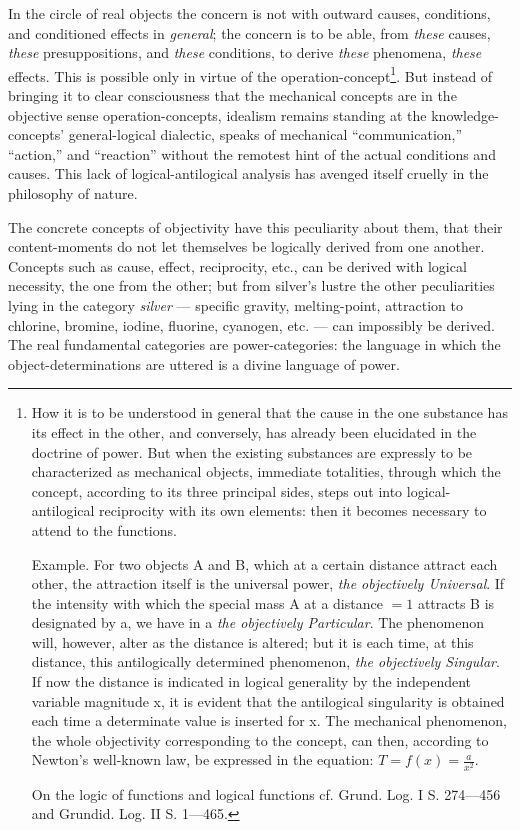 \documentclass[12pt]{book}
\begin{document}
In the circle of real objects the concern is not with outward
causes, conditions, and conditioned effects in \emph{general}; the
concern is to be able, from \emph{these} causes, \emph{these}
presuppositions, and \emph{these} conditions, to derive \emph{these}
phenomena, \emph{these} effects. This is possible only in virtue of
the operation-concept\footnote{How it is to be understood in general
that the cause in the one substance has its effect in the other, and
conversely, has already been elucidated in the doctrine of power.
But when the existing substances are expressly to be characterized
as mechanical objects, immediate totalities, through which the
concept, according to its three principal sides, steps out into
logical-antilogical reciprocity with its own elements: then it
becomes necessary to attend to the functions.

Example. For two objects A and B, which at a certain distance
attract each other, the attraction itself is the universal power,
\emph{the objectively Universal}. If the intensity with which the
special mass A at a distance $= 1$ attracts B is designated by a, we
have in a \emph{the objectively Particular}. The phenomenon will,
however, alter as the distance is altered; but it is each time, at
this distance, this antilogically determined phenomenon, \emph{the
objectively Singular}. If now the distance is indicated in logical
generality by the independent variable magnitude x, it is evident
that the antilogical singularity is obtained each time a determinate
value is inserted for x. The mechanical phenomenon, the whole
objectivity corresponding to the concept, can then, according to
Newton's well-known law, be expressed in the equation:
$T = f(x) = \frac{a}{x^{2}}$.

On the logic of functions and logical functions cf. Grund. Log. I
S. 274---456 and Grundid. Log. II S. 1---465.}. But instead of
bringing
it to clear consciousness that the mechanical concepts are in the
objective sense operation-concepts, idealism remains standing at the
knowledge-concepts' general-logical dialectic, speaks of mechanical
``communication,'' ``action,'' and ``reaction'' without the remotest
hint of the actual conditions and causes. This lack of
logical-antilogical analysis has avenged itself cruelly in the
philosophy of nature.

The concrete concepts of objectivity have this peculiarity about
them, that their content-moments do not let themselves be logically
derived from one another. Concepts such as cause, effect,
reciprocity, etc., can be derived with logical necessity, the one
from the other; but from silver's lustre the other peculiarities
lying in the category \emph{silver} --- specific gravity,
melting-point, attraction to chlorine, bromine, iodine, fluorine,
cyanogen, etc. --- can impossibly be derived. The real fundamental
categories are power-categories: the language in which the
object-determinations are uttered is a divine language of power.
\end{document}

